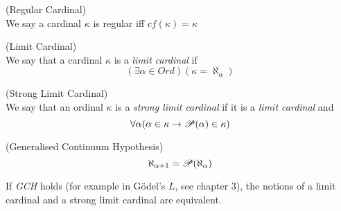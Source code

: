\begin{definition}{(Regular Cardinal)}\label{def:regular_cardinal}\\
We say a cardinal $\kappa$ is regular iff $cf(\kappa) = \kappa$
\end{definition}

\begin{definition}{(Limit Cardinal)}\label{def:limit_cardinal}\\
We say that a cardinal $\kappa$ is a \emph{limit cardinal} if
\begin{equation}
(\exists \alpha \in Ord)(\kappa = \aleph_\alpha)
\end{equation}
\end{definition}

\begin{definition}{(Strong Limit Cardinal)}\label{def:strong_limit_cardinal}\\
We say that an ordinal $\kappa$ is a \emph{strong limit cardinal} if it is a \emph{limit cardinal} and 
\begin{equation}
\forall \alpha (\alpha \in \kappa \rightarrow \mathscr{P} (\alpha) \in \kappa)
\end{equation}
\end{definition}

\begin{definition}{(Generalised Continuum Hypothesis)}\label{def:gch}\\
\begin{equation}
\aleph_{\alpha+1}=\mathscr{P} (\aleph_\alpha)
\end{equation}
\end{definition}
If \emph{GCH} holds (for example in Gödel's $L$, see chapter 3), the notions of a limit cardinal and a strong limit cardinal are equivalent.

\

